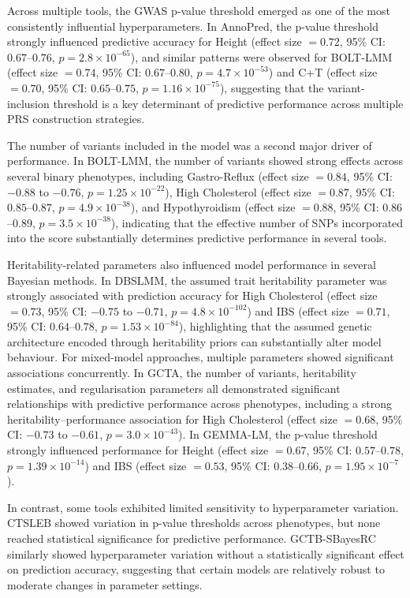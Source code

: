 \documentclass[pdflatex,sn-basic]{sn-jnl}
\begin{document}
Across multiple tools, the GWAS p-value threshold emerged as one of the most consistently influential hyperparameters. In AnnoPred, the p-value threshold strongly influenced predictive accuracy for Height (effect size $= 0.72$, 95\% CI: $0.67$--$0.76$, $p = 2.8 \times 10^{-65}$), and similar patterns were observed for BOLT-LMM (effect size $= 0.74$, 95\% CI: $0.67$--$0.80$, $p = 4.7 \times 10^{-53}$) and C+T (effect size $= 0.70$, 95\% CI: $0.65$--$0.75$, $p = 1.16 \times 10^{-75}$), suggesting that the variant-inclusion threshold is a key determinant of predictive performance across multiple PRS construction strategies.

The number of variants included in the model was a second major driver of performance. In BOLT-LMM, the number of variants showed strong effects across several binary phenotypes, including Gastro-Reflux (effect size $= 0.84$, 95\% CI: $-0.88$ to $-0.76$, $p = 1.25 \times 10^{-22}$), High Cholesterol (effect size $= 0.87$, 95\% CI: $0.85$--$0.87$, $p = 4.9 \times 10^{-38}$), and Hypothyroidism (effect size $= 0.88$, 95\% CI: $0.86$--$0.89$, $p = 3.5 \times 10^{-38}$), indicating that the effective number of SNPs incorporated into the score substantially determines predictive performance in several tools.

Heritability-related parameters also influenced model performance in several Bayesian methods. In DBSLMM, the assumed trait heritability parameter was strongly associated with prediction accuracy for High Cholesterol (effect size $= 0.73$, 95\% CI: $-0.75$ to $-0.71$, $p = 4.8 \times 10^{-102}$) and IBS (effect size $= 0.71$, 95\% CI: $0.64$--$0.78$, $p = 1.53 \times 10^{-84}$), highlighting that the assumed genetic architecture encoded through heritability priors can substantially alter model behaviour. For mixed-model approaches, multiple parameters showed significant associations concurrently. In GCTA, the number of variants, heritability estimates, and regularisation parameters all demonstrated significant relationships with predictive performance across phenotypes, including a strong heritability--performance association for High Cholesterol (effect size $= 0.68$, 95\% CI: $-0.73$ to $-0.61$, $p = 3.0 \times 10^{-43}$). In GEMMA-LM, the p-value threshold strongly influenced performance for Height (effect size $= 0.67$, 95\% CI: $0.57$--$0.78$, $p = 1.39 \times 10^{-14}$) and IBS (effect size $= 0.53$, 95\% CI: $0.38$--$0.66$, $p = 1.95 \times 10^{-7}$).

In contrast, some tools exhibited limited sensitivity to hyperparameter variation. CTSLEB showed variation in p-value thresholds across phenotypes, but none reached statistical significance for predictive performance. GCTB-SBayesRC similarly showed hyperparameter variation without a statistically significant effect on prediction accuracy, suggesting that certain models are relatively robust to moderate changes in parameter settings.
\end{document}

